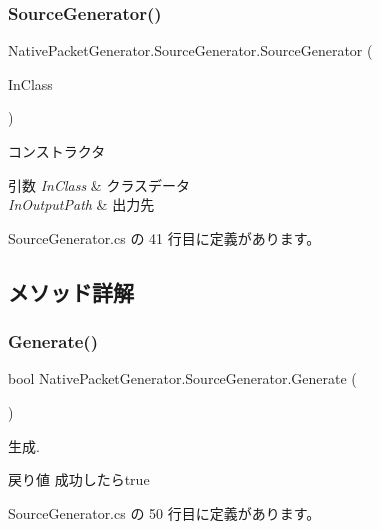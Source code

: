 \subsubsection{\texorpdfstring{Source\+Generator()}{SourceGenerator()}}
{\footnotesize\ttfamily Native\+Packet\+Generator.\+Source\+Generator.\+Source\+Generator (\begin{DoxyParamCaption}\item[{\mbox{\hyperlink{classNativePacketGenerator_1_1ClassData}{Class\+Data}}}]{In\+Class }\end{DoxyParamCaption})}



コンストラクタ 


\begin{DoxyParams}{引数}
{\em In\+Class} & クラスデータ\\
\hline
{\em In\+Output\+Path} & 出力先\\
\hline
\end{DoxyParams}


 Source\+Generator.\+cs の 41 行目に定義があります。



\subsection{メソッド詳解}
\mbox{\label{classNativePacketGenerator_1_1SourceGenerator_aeaea7a3e074b34f368319ec0c7497b0d}} 
\subsubsection{\texorpdfstring{Generate()}{Generate()}}
{\footnotesize\ttfamily bool Native\+Packet\+Generator.\+Source\+Generator.\+Generate (\begin{DoxyParamCaption}{ }\end{DoxyParamCaption})}



生成. 

\begin{DoxyReturn}{戻り値}
成功したらtrue
\end{DoxyReturn}


 Source\+Generator.\+cs の 50 行目に定義があります。

